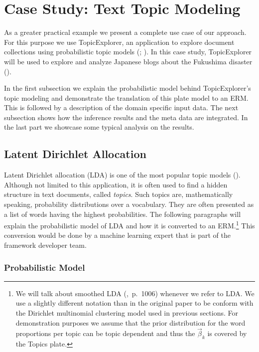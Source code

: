 \section{Case Study: Text Topic Modeling}\label{sec:casestudy}

As a greater practical example we present a complete use case of our approach. For this purpose we use TopicExplorer, an application to explore document collections using probabilistic topic models (\cite{hinneburg2014topic}; \cite{hinneburg2012topicexplorer}). In this case study, TopicExplorer will be used to explore and analyze Japanese blogs about the Fukushima disaster (\cite{ines2011fukushima}).

In the first subsection we explain the probabilistic model behind TopicExplorer's topic modeling and demonstrate the translation of this plate model to an ERM. This is followed by a description of the domain specific input data. The next subsection shows how the inference results and the meta data are integrated. In the last part we showcase some typical analysis on the results.

\subsection{Latent Dirichlet Allocation}

Latent Dirichlet allocation (LDA) is one of the most popular topic models (\cite{blei2003latent}). Although not limited to this application, it is often used to find a hidden structure in text documents, called \emph{topics}. Such topics are, mathematically speaking, probability distributions over a vocabulary. They are often presented as a list of words having the highest probabilities. The following paragraphs will explain the probabilistic model of LDA and how it is converted to an ERM.\footnote{We will talk about smoothed LDA (\cite{blei2003latent},~p.~1006) whenever we refer to LDA. We use a slightly different notation than in the original paper to be conform with the Dirichlet multinomial clustering model used in previous sections. For demonstration purposes we assume that the prior distribution for the word proportions per topic can be topic dependent and thus the $\vec \beta_k$ is covered by the Topics plate.} This conversion would be done by a machine learning expert that is part of the framework developer team.

\subsubsection{Probabilistic Model}

